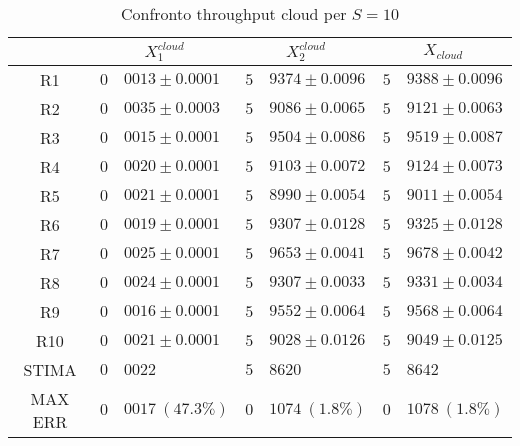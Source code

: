 \begin{table}[!h]
\begin{tabular}{c|r@{.}l|r@{.}l|r@{.}l}
& \multicolumn{2}{|c|}{$X_1^{cloud}$}
& \multicolumn{2}{|c|}{$X_2^{cloud}$}
& \multicolumn{2}{|c}{$X_{cloud}$} 
\\          
\hline
R1      & $0$&$0013 \pm 0.0001$ & $5$&$9374 \pm 0.0096$ & $5$&$9388 \pm 0.0096$ \\
R2      & $0$&$0035 \pm 0.0003$ & $5$&$9086 \pm 0.0065$ & $5$&$9121 \pm 0.0063$ \\
R3      & $0$&$0015 \pm 0.0001$ & $5$&$9504 \pm 0.0086$ & $5$&$9519 \pm 0.0087$ \\
R4      & $0$&$0020 \pm 0.0001$ & $5$&$9103 \pm 0.0072$ & $5$&$9124 \pm 0.0073$ \\
R5      & $0$&$0021 \pm 0.0001$ & $5$&$8990 \pm 0.0054$ & $5$&$9011 \pm 0.0054$ \\
R6      & $0$&$0019 \pm 0.0001$ & $5$&$9307 \pm 0.0128$ & $5$&$9325 \pm 0.0128$ \\
R7      & $0$&$0025 \pm 0.0001$ & $5$&$9653 \pm 0.0041$ & $5$&$9678 \pm 0.0042$ \\
R8      & $0$&$0024 \pm 0.0001$ & $5$&$9307 \pm 0.0033$ & $5$&$9331 \pm 0.0034$ \\
R9      & $0$&$0016 \pm 0.0001$ & $5$&$9552 \pm 0.0064$ & $5$&$9568 \pm 0.0064$ \\
R10     & $0$&$0021 \pm 0.0001$ & $5$&$9028 \pm 0.0126$ & $5$&$9049 \pm 0.0125$ \\
STIMA   & $0$&$0022$            & $5$&$8620$            & $5$&$8642$            \\
MAX ERR & $0$&$0017 \ (47.3\%)$ & $0$&$1074 \ (1.8\%)$  & $0$&$1078 \ (1.8\%)$    
\end{tabular}
\centering
\caption{Confronto throughput cloud per $S=10$}
\label{tab:10_xcloud}
\end{table}
